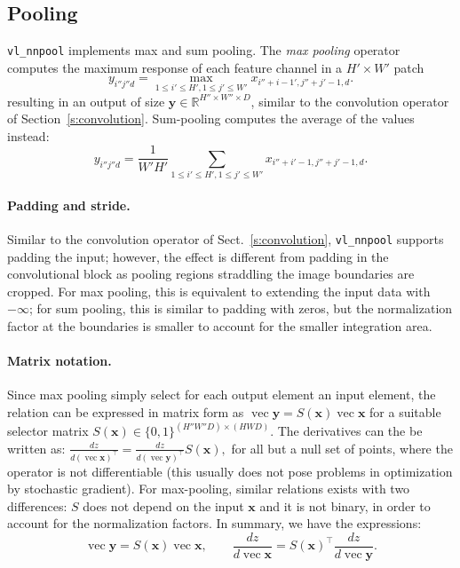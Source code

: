 \documentclass[12pt]{article}
\newcommand{\real}{\mathbb{R}}
\newcommand{\vv}{\operatorname{vec}}
\newcommand{\bx}{\mathbf{x}}
\newcommand{\by}{\mathbf{y}}
\begin{document}
\subsection{Pooling}\label{s:pooling}

\verb!vl_nnpool! implements max and sum pooling. The \emph{max pooling} operator computes the maximum response of each feature channel in a $H' \times W'$ patch
\[
y_{i''j''d} = \max_{1\leq i' \leq H', 1 \leq j' \leq W'} x_{i''+i-1',j''+j'-1,d}.
\]
resulting in an output of size $\by\in\real^{H''\times W'' \times D}$, similar to the convolution operator of Section~\ref{s:convolution}. Sum-pooling computes the average of the values instead:
\[
y_{i''j''d} = \frac{1}{W'H'}
\sum_{1\leq i' \leq H', 1 \leq j' \leq W'} x_{i''+i'-1,j''+j'-1,d}.
\]

\paragraph{Padding and stride.} Similar to the convolution operator of Sect.~\ref{s:convolution}, \verb!vl_nnpool! supports padding the input; however, the effect is different from padding in the convolutional block as pooling regions straddling the image boundaries are cropped. For max pooling, this is equivalent to extending the input data with $-\infty$; for sum pooling, this is similar to padding with zeros, but the normalization factor at the boundaries is smaller to account for the smaller integration area.

\paragraph{Matrix notation.} Since max pooling simply select for each output element an input element, the relation can be expressed in matrix form as
$
    \vv\by = S(\bx) \vv \bx
$
for a suitable selector matrix $S(\bx)\in\{0,1\}^{(H''W''D) \times (HWD)}$. The derivatives can the be written as:
$
\frac{d z}{d (\vv \bx)^\top}
=
\frac{d z}{d (\vv \by)^\top}
S(\bx),
$
for all but a null set of points, where the operator is not differentiable (this usually does not pose problems in optimization by stochastic gradient). For max-pooling, similar relations exists with two differences: $S$ does not depend on the input $\bx$ and it is not binary, in order to account for the normalization factors. In summary, we have the expressions:
\begin{equation}\label{e:max-mat}
\boxed{
\vv\by = S(\bx) \vv \bx,
\qquad
\frac{d z}{d \vv \bx}
=
S(\bx)^\top
\frac{d z}{d \vv \by}.
}
\end{equation}
\end{document}
